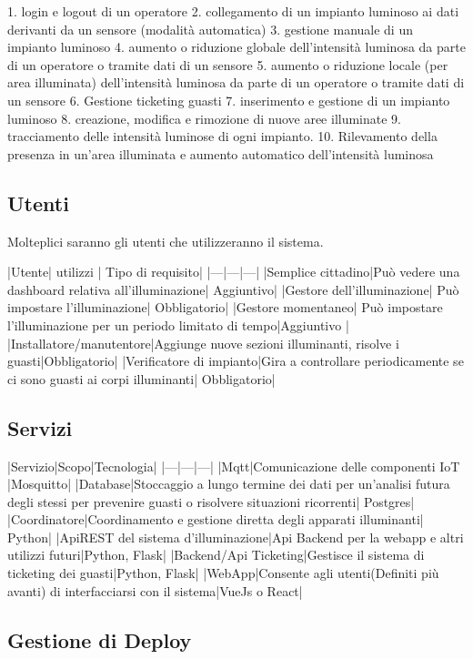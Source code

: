 1. login e logout di un operatore
2. collegamento di un impianto luminoso ai dati derivanti da un sensore (modalità automatica)
3. gestione manuale di un impianto luminoso
4. aumento o riduzione globale dell’intensità luminosa da parte di un operatore o tramite dati di un
sensore
5. aumento o riduzione locale (per area illuminata) dell’intensità luminosa da parte di un operatore o tramite dati di un sensore
6. Gestione ticketing guasti
7. inserimento e gestione di un impianto luminoso
8. creazione, modifica e rimozione di nuove aree illuminate
9. tracciamento delle intensità luminose di ogni impianto.
10. Rilevamento della presenza in un’area illuminata e aumento automatico dell’intensità
luminosa

\subsection{Utenti}

Molteplici saranno gli utenti che utilizzeranno il sistema.


|Utente| utilizzi | Tipo di requisito|
|---|---|---|
|Semplice cittadino|Può vedere una dashboard relativa all'illuminazione| Aggiuntivo|
|Gestore dell'illuminazione| Può impostare l'illuminazione| Obbligatorio|
|Gestore momentaneo| Può impostare l'illuminazione per un periodo limitato di tempo|Aggiuntivo |
|Installatore/manutentore|Aggiunge nuove sezioni illuminanti, risolve i guasti|Obbligatorio|
|Verificatore di impianto|Gira a controllare periodicamente se ci sono guasti ai corpi illuminanti| Obbligatorio|

\subsection{Servizi}

|Servizio|Scopo|Tecnologia|
|---|---|---|
|Mqtt|Comunicazione delle componenti IoT |Mosquitto|
|Database|Stoccaggio a lungo termine dei dati per un'analisi futura degli stessi per prevenire guasti o risolvere situazioni ricorrenti| Postgres|
|Coordinatore|Coordinamento e gestione diretta degli apparati illuminanti| Python|
|ApiREST del sistema d'illuminazione|Api Backend per la webapp e altri utilizzi futuri|Python, Flask|
|Backend/Api Ticketing|Gestisce il sistema di ticketing dei guasti|Python, Flask|
|WebApp|Consente agli utenti(Definiti più avanti) di interfacciarsi con il sistema|VueJs o React|

\subsection{Gestione di Deploy}

